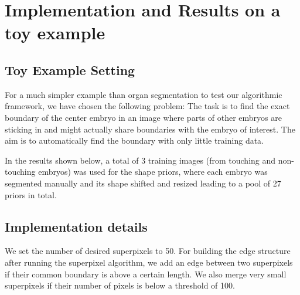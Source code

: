 \documentclass{article} %
\begin{document}






\section{Implementation and Results on a toy example}

\subsection{Toy Example Setting}
For a much simpler example than organ segmentation to test our algorithmic framework, we have chosen the following problem: The task is to find the exact boundary of the center embryo in an image where parts of other embryos are sticking in and might actually share boundaries with the embryo of interest. The aim is to automatically find the boundary with only little training data.

In the results shown below, a total of 3 training images (from touching and non-touching embryos) was used for the shape priors, where each embryo was segmented manually and its shape shifted and resized leading to a pool of 27 priors in total.

\subsection{Implementation details}
We set the number of desired superpixels to 50. For building the edge structure after running the superpixel algorithm, we add an edge between two superpixels if their common boundary is above a certain length. We also merge very small superpixels if their number of pixels is below a threshold of 100. 
\end{document}
